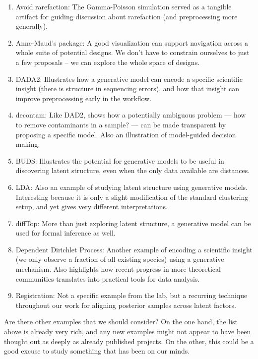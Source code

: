 \documentclass[]{article}
\begin{document}
\begin{enumerate}
\item Avoid rarefaction: The Gamma-Poisson simulation served as a tangible artifact for guiding discussion about rarefaction (and preprocessing more generally).
\item Anne-Maud's package: A good visualization can support navigation across a whole suite of potential designs. We don't have to constrain ourselves to just a few proposals -- we can explore the whole space of designs.
\item DADA2: Illustrates how a generative model can encode a specific scientific insight (there is structure in sequencing errors), and how that insight can improve preprocessing early in the workflow.
\item decontam: Like DAD2, shows how a potentially ambiguous problem — how to remove contaminants in a sample? — can be made transparent by proposing a specific model. Also an illustration of model-guided decision making.
\item BUDS: Illustrates the potential for generative models to be useful in discovering latent structure, even when the only data available are distances.
\item LDA: Also an example of studying latent structure using generative models. Interesting because it is only a slight modification of the standard clustering setup, and yet gives very different interpretations.
\item diffTop: More than just exploring latent structure, a generative model can be used for formal inference as well.
\item Dependent Dirichlet Process: Another example of encoding a scientific insight (we only observe a fraction of all existing species) using a generative mechanism. Also highlights how recent progress in more theoretical communities translates into practical tools for data analysis.
\item Registration: Not a specific example from the lab, but a recurring technique throughout our work for aligning posterior samples across latent factors.
\end{enumerate}

Are there other examples that we should consider? On the one hand, the list above is already very rich, and any new examples might not appear to have been thought out as deeply as already published projects. On the other, this could be a good excuse to study something that has been on our minds.
\end{document}
